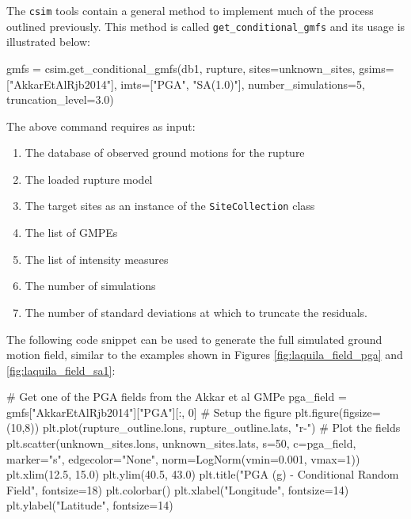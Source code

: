 The \verb=csim= tools contain a general method to implement much of the process outlined previously. This method is called \verb=get_conditional_gmfs= and its usage is illustrated below:

\begin{python}
gmfs = csim.get_conditional_gmfs(db1,
                                 rupture, 
                                 sites=unknown_sites, 
                                 gsims=["AkkarEtAlRjb2014"],
                                 imts=["PGA", "SA(1.0)"],
                                 number_simulations=5,
                                 truncation_level=3.0)
\end{python}
The above command requires as input:
\begin{enumerate}
\item The database of observed ground motions for the rupture
\item The loaded rupture model
\item The target sites as an instance of the \verb=SiteCollection= class
\item The list of GMPEs
\item The list of intensity measures
\item The number of simulations
\item The number of standard deviations at which to truncate the residuals.
\end{enumerate}

The following code snippet can be used to generate the full simulated ground motion field, similar to the examples shown in Figures \ref{fig:laquila_field_pga} and \ref{fig:laquila_field_sa1}:

\begin{python}[frame=single]
# Get one of the PGA fields from the Akkar et al GMPe
pga_field = gmfs["AkkarEtAlRjb2014"]["PGA"][:, 0]
# Setup the figure
plt.figure(figsize=(10,8))
plt.plot(rupture_outline.lons, rupture_outline.lats, "r-")
# Plot the fields
plt.scatter(unknown_sites.lons, unknown_sites.lats, 
            s=50,
            c=pga_field,
            marker="s",
            edgecolor="None",
            norm=LogNorm(vmin=0.001, vmax=1))
plt.xlim(12.5, 15.0)
plt.ylim(40.5, 43.0)
plt.title("PGA (g) - Conditional Random Field", fontsize=18)
plt.colorbar()
plt.xlabel("Longitude", fontsize=14)
plt.ylabel("Latitude", fontsize=14)
\end{python}

